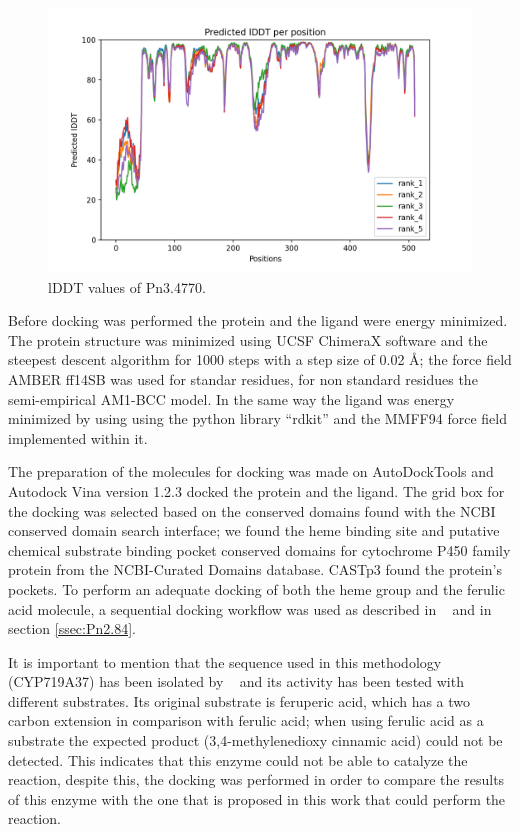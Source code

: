 \documentclass[12pt]{article}
\newcommand{\textcite}[1]{\citeauthor{#1}~\citeyear{#1}}
\begin{document}
	\FloatBarrier
	\begin{figure}
		\centering
		\includegraphics[width=\textwidth-50pt]{../5/known/AlphaFold2/Met_dioixi_ef326_plddt.png}
		\caption{lDDT values of Pn3.4770.}
		\label{fig5k_3}
	\end{figure}
	\FloatBarrier
	
	\newpage
	
	Before docking was performed the protein and the ligand were energy minimized. The protein structure was minimized using UCSF ChimeraX software \cite{chimera,chimera_2} and the steepest descent algorithm for 1000 steps with a step size of 0.02 \r{A}; the force field AMBER ff14SB was used for standar residues, for non standard residues the semi-empirical AM1-BCC model. \cite{am1_bcc,am1_bcc_2,am1_bcc_3} In the same way the ligand was energy minimized by using using the python library ``rdkit'' and the MMFF94 force field implemented within it. \cite{rdkit,rdkit_mmff}
	
	The preparation of the molecules for docking was made on AutoDockTools and Autodock Vina version 1.2.3 docked the protein and the ligand. \cite{adt,vina,vina_2} The grid box for the docking was selected based on the conserved domains found with the NCBI conserved domain search interface; we found the heme binding site and putative chemical substrate binding pocket conserved domains for cytochrome P450 family protein from the NCBI-Curated Domains database. \cite{cdd,cdd_2}  CASTp3 found the protein's pockets. \cite{castp} To perform an adequate docking of both the heme group and the ferulic acid molecule, a sequential docking workflow was used as described in \textcite{sequential} and in section \ref{ssec:Pn2.84}.
	
	It is important to mention that the sequence used in this methodology (CYP719A37) has been isolated by \textcite{methylenedioxy} and its activity has been tested with different substrates. Its original substrate is feruperic acid, which has a two carbon extension in comparison with ferulic acid; when using ferulic acid as a substrate the expected product (3,4-methylenedioxy cinnamic acid) could not be detected. This indicates that this enzyme could not be able to catalyze the reaction, despite this, the docking was performed in order to compare the results of this enzyme with the one that is proposed in this work that could perform the reaction. 
	
\end{document}
